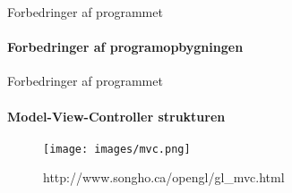 \begin{frame}{Forbedringer af programmet}
\framesubtitle{Forbedringer af programopbygningen}
 

\end{frame}
\begin{frame}{Forbedringer af programmet}
\framesubtitle{Model-View-Controller strukturen}
\begin{center}
\begin{figure}
  \texttt{[image: images/mvc.png]}
  \caption{http://www.songho.ca/opengl/gl\_mvc.html}
\end{figure}
\end{center}

\end{frame}
